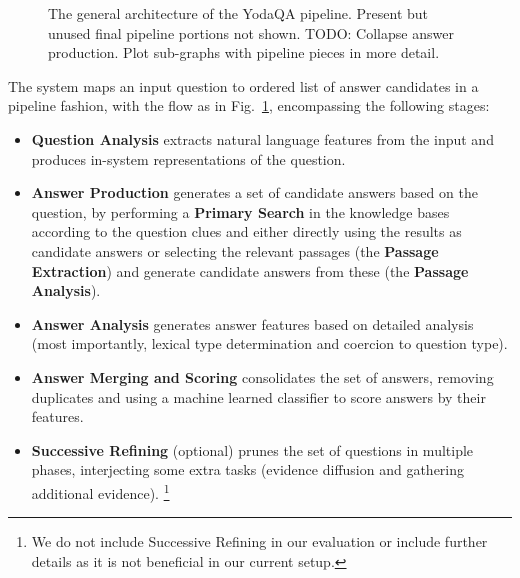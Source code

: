 \begin{figure}[hb]
\begin{center}
\caption{The general architecture of the YodaQA pipeline.  Present but unused final pipeline portions not shown.
TODO: Collapse answer production.  Plot sub-graphs with pipeline pieces in more detail.}
\label{fig:arch}
\end{center}
\end{figure}%

The system maps an input question to ordered list of answer candidates in a pipeline fashion,
with the flow as in Fig.~\ref{fig:arch}, encompassing the following stages:

\begin{itemize}
\item \textbf{Question Analysis} extracts natural language features from
	the input and produces in-system representations of the question.
\item \textbf{Answer Production} generates a set of candidate answers based on the question,
	by performing a \textbf{Primary Search} in the knowledge bases according to the question clues
	and either directly using the results as candidate answers
	or selecting the relevant passages (the \textbf{Passage Extraction})
	and generate candidate answers from these (the \textbf{Passage Analysis}).
\item \textbf{Answer Analysis} generates answer features based on detailed analysis (most importantly, lexical type determination and coercion to question type).
\item \textbf{Answer Merging and Scoring} consolidates the set of answers, removing duplicates and using a machine learned classifier to score answers by their features.
\item \textbf{Successive Refining} (optional) prunes the set of questions in multiple phases, interjecting some extra tasks (evidence diffusion and gathering additional evidence).%
\footnote{We do not include Successive Refining in our evaluation or include further details as it is not beneficial in our current setup.}
\end{itemize}


